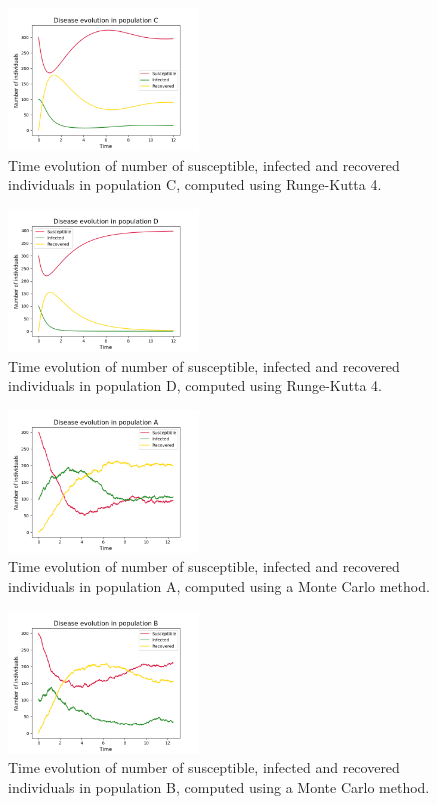 \documentclass[notitlepage, reprint, nofootinbib]{revtex4-1}
\begin{document}
\begin{figure}[h!]
	\centering
	\includegraphics[width=0.45\textwidth]{../Figures/RK4_population_C}
	\caption{Time evolution of number of susceptible, infected and recovered individuals in population C, computed using Runge-Kutta 4.}
	\label{RK4_C}
\end{figure}
\begin{figure}[h!]
	\centering
	\includegraphics[width=0.45\textwidth]{../Figures/RK4_population_D}
	\caption{Time evolution of number of susceptible, infected and recovered individuals in population D, computed using Runge-Kutta 4.}
	\label{RK4_D}
\end{figure}
\begin{figure}
	\centering
	\includegraphics[width=0.45\textwidth]{../Figures/MC_population_A}
	\caption{Time evolution of number of susceptible, infected and recovered individuals in population A, computed using a Monte Carlo method.}
	\label{MC_A}
\end{figure}
\begin{figure}
	\centering
	\includegraphics[width=0.45\textwidth]{../Figures/MC_population_B}
	\caption{Time evolution of number of susceptible, infected and recovered individuals in population B, computed using a Monte Carlo method.}
	\label{MC_B}
\end{figure}
\end{document}
